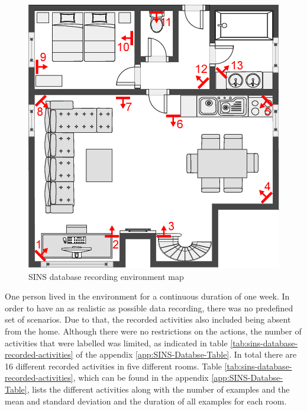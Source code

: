 \begin{figure}[htbp]
	\centering
	\includegraphics[scale=0.35]{baa-documentation/img/SINS_database_floor_map.png}
	\caption[SINS database recording environment map]{SINS database recording environment map \footnotemark}
	\label{fig:sins-database-floor-map}
\end{figure}
\noindent
One person lived in the environment for a continuous duration of one week. In order to have an as realistic as possible data recording, there was no predefined set of scenarios. Due to that, the recorded activities also included being absent from the home. Although there were no restrictions on the actions, the number of activities that were labelled was limited, as indicated in table \ref{tab:sins-database-recorded-activities} of the appendix \ref{app:SINS-Databse-Table}. In total there are 16 different recorded activities in five different rooms. Table \ref{tab:sins-database-recorded-activities}, which can be found in the appendix \ref{app:SINS-Databse-Table}, lists the different activities along with the number of examples and the mean and standard deviation and the duration of all examples for each room.

